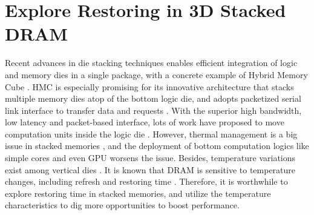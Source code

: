 

\section{Explore Restoring in 3D Stacked DRAM} \label{work:stacked}
Recent advances in die stacking techniques enables efficient integration of logic and memory dies in a single package, with a concrete example of Hybrid Memory Cube \cite{HMC:spec2}.
HMC is especially promising for its innovative architecture that stacks multiple memory dies atop of the bottom logic die, and adopts packetized serial link interface to transfer data and requests \cite{ICCD15:dlb}.
With the superior high bandwidth, low latency and packet-based interface, lots of work have proposed to move computation units inside the logic die \cite{JMicro:ndp, ISCA15:pim}.
However, thermal management is a big issue in stacked memories \cite{DAC06:3dmodel, WONDP14:thermal}, and the deployment of bottom computation logics like simple cores \cite{ISCA15:pim} and even GPU \cite{HPDC14:pim_gpu} worsens the issue. Besides, temperature variations exist among vertical dies \cite{ICCD13:temp}. It is known that DRAM is sensitive to temperature changes, including refresh \cite{HPCA15:al-dram, ISCA13:ddr4} and restoring time \cite{PATENT14:twr, MEM14:twr}.
Therefore, it is worthwhile to explore restoring time in stacked memories, and utilize the temperature characteristics to dig more opportunities to boost performance. 



